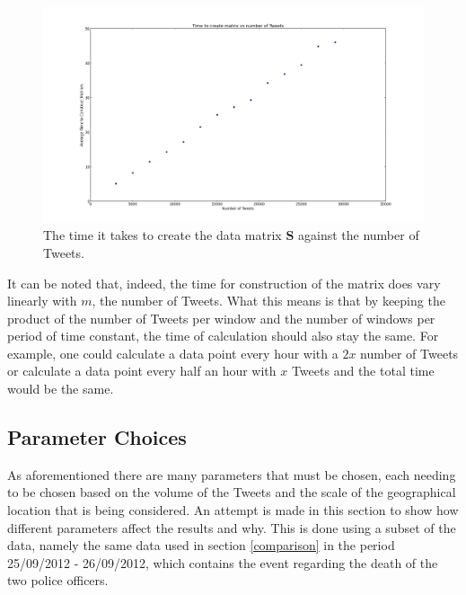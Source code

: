 \documentclass[11pt,a4paper]{article}
\newcommand{\smat}{\mathbf{S}}
\begin{document}
\begin{figure}[H]
\centering
\includegraphics[scale=0.25]{Time_Matrix_Construction.png}
\caption{The time it takes to create the data matrix $\smat$ against the number of Tweets.}
\label{time_matrix_construction}
\end{figure}

It can be noted that, indeed, the time for construction of the matrix does vary linearly with $m$, the number of Tweets. What this means is that by keeping the product of the number of Tweets per window and the number of windows per period of time constant, the time of calculation should also stay the same. For example, one could calculate a data point every hour with a $2x$ number of Tweets or calculate a data point every half an hour with $x$ Tweets and the total time would be the same.

\subsection{Parameter Choices}

As aforementioned there are many parameters that must be chosen, each needing to be chosen based on the volume of the Tweets and the scale of the geographical location that is being considered. An attempt is made in this section to show how different parameters affect the results and why. This is done using a subset of the data, namely the same data used in section \ref{comparison} in the period 25/09/2012 - 26/09/2012, which contains the event regarding the death of the two police officers.
\end{document}

